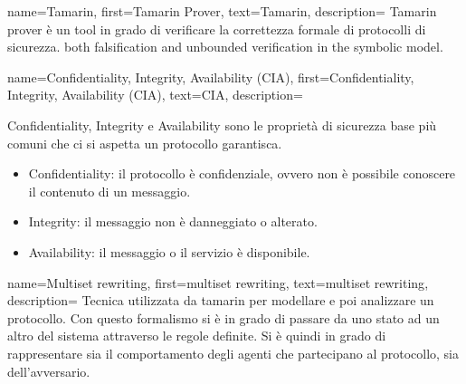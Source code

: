 {
    name={Tamarin},
    first={Tamarin Prover},
    text={Tamarin},
    description={
            Tamarin prover è un tool in grado di verificare la correttezza formale di protocolli di sicurezza.
            both falsification and unbounded verification in the symbolic model.
        }
}
{
    name={Confidentiality, Integrity, Availability (CIA)},
    first={Confidentiality, Integrity, Availability (CIA)},
    text={CIA},
    description={
            Confidentiality, Integrity e Availability sono le proprietà di sicurezza base più comuni che ci si aspetta un protocollo garantisca.
            \begin{itemize}
                \item Confidentiality: il protocollo è confidenziale, ovvero non è possibile conoscere il contenuto di un messaggio.
                \item Integrity: il messaggio non è danneggiato o alterato.
                \item Availability: il messaggio o il servizio è disponibile.
            \end{itemize}
        }
}
{
    name={Multiset rewriting},
    first={multiset rewriting},
    text={multiset rewriting},
    description={
            Tecnica utilizzata da \gls{tamarin} per modellare e poi analizzare un protocollo.
            Con questo formalismo si è in grado di passare da uno stato ad un altro del sistema attraverso le regole definite.
            Si è quindi in grado di rappresentare sia il comportamento degli agenti che partecipano al protocollo, sia dell'avversario.
        }
}
